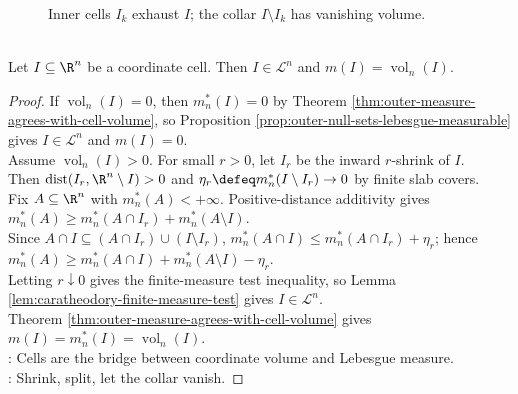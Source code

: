 \begin{figure}[H]
  \centering
  
  \caption{Inner cells $I_k$ exhaust $I$; the collar $I\setminus I_k$ has vanishing volume.}
  \label{fig:open-cell-inner-shrink}
\end{figure}

\begin{proposition} \label{prop:cells-lebesgue-measurable-volume} \\
Let $I\subseteq\R^n$ be a coordinate cell. Then $I\in\mathcal{L}^n$ and $m(I)=\operatorname{vol}_n(I)$.
\begin{proof}
If $\operatorname{vol}_n(I)=0$, then $m_n^\ast(I)=0$ by Theorem \ref{thm:outer-measure-agrees-with-cell-volume}, so Proposition \ref{prop:outer-null-sets-lebesgue-measurable} gives $I\in\mathcal{L}^n$ and $m(I)=0$.\\
Assume $\operatorname{vol}_n(I)>0$. For small $r>0$, let $I_r$ be the inward $r$-shrink of $I$.\\
Then $\operatorname{dist}(I_r,\R^n\setminus I)>0$ and $\eta_r\defeq m_n^\ast(I\setminus I_r)\to0$ by finite slab covers.\\
Fix $A\subseteq\R^n$ with $m_n^\ast(A)<+\infty$. Positive-distance additivity gives $m_n^\ast(A)\geq m_n^\ast(A\cap I_r)+m_n^\ast(A\setminus I)$.\\
Since $A\cap I\subseteq(A\cap I_r)\cup(I\setminus I_r)$, $m_n^\ast(A\cap I)\leq m_n^\ast(A\cap I_r)+\eta_r$; hence $m_n^\ast(A)\geq m_n^\ast(A\cap I)+m_n^\ast(A\setminus I)-\eta_r$.\\
Letting $r\downarrow0$ gives the finite-measure test inequality, so Lemma \ref{lem:caratheodory-finite-measure-test} gives $I\in\mathcal{L}^n$.\\
Theorem \ref{thm:outer-measure-agrees-with-cell-volume} gives $m(I)=m_n^\ast(I)=\operatorname{vol}_n(I)$.\\
: Cells are the bridge between coordinate volume and Lebesgue measure.\\
: Shrink, split, let the collar vanish.
\end{proof}
\end{proposition}
